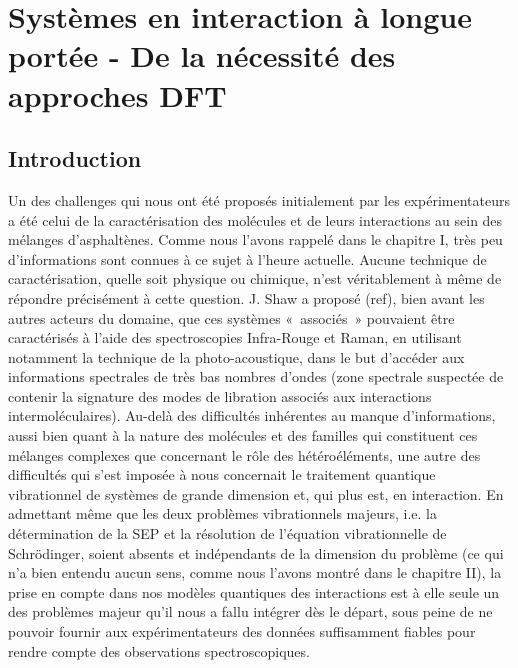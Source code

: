\chapter[longue portee]{Systèmes en interaction à longue portée - De la nécessité des approches DFT}
\minitoc
\restoregeometry

\newpage

\section*{Introduction}

Un des challenges qui nous ont été proposés initialement par les expérimentateurs a été celui de la caractérisation des molécules et de leurs interactions au sein des mélanges d’asphaltènes. Comme nous l’avons rappelé dans le chapitre I, très peu d’informations sont connues à ce sujet à l’heure actuelle. Aucune technique de caractérisation, quelle soit physique ou chimique, n’est véritablement à même de répondre précisément à cette question. J. Shaw a proposé (ref), bien avant les autres acteurs du domaine, que ces systèmes « associés » pouvaient être caractérisés à l’aide des spectroscopies Infra-Rouge et Raman, en utilisant notamment la technique de la photo-acoustique, dans le but d’accéder aux informations spectrales de très bas nombres d’ondes (zone spectrale suspectée de contenir la signature des modes de libration associés aux interactions intermoléculaires). Au-delà des difficultés inhérentes au manque d’informations, aussi bien quant à la nature des molécules et des familles qui constituent ces mélanges complexes que concernant le rôle des hétéroéléments, une autre des difficultés qui s’est imposée à nous concernait le traitement quantique vibrationnel de systèmes de grande dimension et, qui plus est, en interaction. En admettant même que les deux problèmes vibrationnels majeurs, i.e. la détermination de la SEP et la résolution de l’équation vibrationnelle de Schr\"{o}dinger, soient absents et indépendants de la dimension du problème (ce qui n’a bien entendu aucun sens, comme nous l’avons montré dans le chapitre II), la prise en compte dans nos modèles quantiques des interactions est à elle seule un des problèmes majeur qu’il nous a fallu intégrer dès le départ, sous peine de ne pouvoir fournir aux expérimentateurs des données suffisamment fiables pour rendre compte des observations spectroscopiques. 

